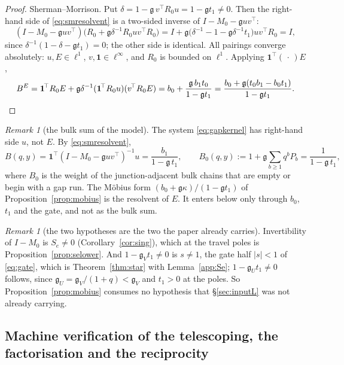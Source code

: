 \documentclass[11pt]{article}
\theoremstyle{plain}
\theoremstyle{definition}
\theoremstyle{remark}
\newtheorem{remark}[theorem]{Remark}
\begin{document}
\begin{proof}
Sherman--Morrison. Put $\delta=1-\mathfrak g\,v^{\!\top}R_0u=1-\mathfrak g t_1\ne0$. Then the
right-hand side of \eqref{eq:smresolvent} is a two-sided inverse of
$I-M_0-\mathfrak g uv^{\!\top}$:
\[
  (I-M_0-\mathfrak g uv^{\!\top})\bigl(R_0+\mathfrak g\delta^{-1}R_0uv^{\!\top}R_0\bigr)
  =I+\mathfrak g\bigl(\delta^{-1}-1-\mathfrak g\delta^{-1}t_1\bigr)uv^{\!\top}R_0
  =I ,
\]
since $\delta^{-1}(1-\delta-\mathfrak gt_1)=0$; the other side is identical. All pairings converge
absolutely: $u,E\in\ell^1$, $v,\mathbf 1\in\ell^\infty$, and $R_0$ is bounded on $\ell^1$.
Applying $\mathbf 1^{\!\top}(\,\cdot\,)E$,
\[
  B^E=\mathbf 1^{\!\top}R_0E+\mathfrak g\delta^{-1}(\mathbf 1^{\!\top}R_0u)(v^{\!\top}R_0E)
   =b_0+\frac{\mathfrak g\,b_1t_0}{1-\mathfrak g t_1}
   =\frac{b_0+\mathfrak g(t_0b_1-b_0t_1)}{1-\mathfrak g t_1}. \qedhere
\]
\end{proof}

\begin{remark}[the bulk sum of the model]\label{rem:bulksource}
The system \eqref{eq:gapkernel} has right-hand side $u$, not $E$. By \eqref{eq:smresolvent},
\[
   B(q,y)=\mathbf 1^{\!\top}(I-M_0-\mathfrak guv^{\!\top})^{-1}u=\frac{b_1}{1-\mathfrak g\,t_1},
   \qquad
   B_0(q,y):=1+\mathfrak g\sum_{b\ge1}q^bP_b=\frac1{1-\mathfrak g\,t_1},
\]
where $B_0$ is the weight of the junction-adjacent bulk chains that are empty or begin with a gap
run. The M\"obius form $(b_0+\mathfrak g\kappa)/(1-\mathfrak gt_1)$ of
Proposition~\ref{prop:mobius} is the resolvent of $E$. It enters below only through $b_0$, $t_1$ and
the gate, and not as the bulk sum.
\end{remark}

\begin{remark}[the two hypotheses are the two the paper already carries]\label{rem:mobhyp}
Invertibility of $I-M_0$ is $S_e\ne0$ (Corollary~\ref{cor:sing}), which at the travel poles is
Proposition~\ref{prop:selower}. And $1-\mathfrak g_V t_1\ne0$ is $s\ne1$, the gate half $|s|<1$ of
\eqref{eq:gate}, which is Theorem~\ref{thm:star} with Lemma~\ref{app:Se};
$1-\mathfrak g_Ut_1\ne0$ follows, since $\mathfrak g_U=\mathfrak g_V/(1+q)<\mathfrak g_V$ and
$t_1>0$ at the poles. So Proposition~\ref{prop:mobius} consumes no hypothesis that
\S\ref{sec:inputL} was not already carrying.
\end{remark}

\subsection*{Machine verification of the telescoping, the factorisation and the reciprocity}
\end{document}
